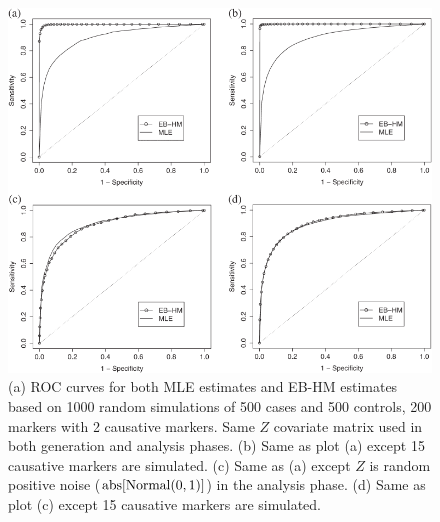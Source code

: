 \documentclass[oupdraft]{bio}
\begin{document}
\begin{figure}[!p]
\centering\includegraphics{fig3}
\caption{(a) ROC curves for both MLE estimates and
EB-HM estimates based on 1000 random simulations of 500
cases and 500 controls, 200 markers with 2 causative
markers. Same $Z$ covariate matrix used in both generation
and analysis phases. (b) Same as plot (a) except 15
causative markers are simulated. (c) Same as (a) except
$Z$ is random positive noise
($\hbox{abs} [ \hbox{Normal} (0, 1) ]$) in the analysis
phase. (d) Same as plot (c) except 15 causative markers
are simulated.}
\label{Fig3}
\end{figure}
\end{document}
